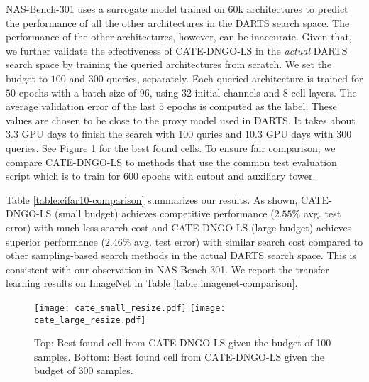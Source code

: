 NAS-Bench-301 uses a surrogate model trained on $60$k architectures to predict the performance of all the other architectures in the DARTS search space. The performance of the other architectures, however, can be inaccurate. Given that, we further validate the effectiveness of CATE-DNGO-LS in the \textit{actual} DARTS search space by training the queried architectures from scratch. We set the budget to $100$ and $300$ queries, separately. Each queried architecture is trained for $50$ epochs with a batch size of $96$, using $32$ initial channels and $8$ cell layers. The average validation error of the last $5$ epochs is computed as the label. These values are chosen to be close to the proxy model used in DARTS. It takes about $3.3$ GPU days to finish the search with $100$ quries and $10.3$ GPU days with $300$ queries. See Figure \ref{fig:cell} for the best found cells. To ensure fair comparison, we compare CATE-DNGO-LS to methods \cite{liu2018darts,Li2019RandomSA,yan2020arch,white2019bananas} that use the common test evaluation script which is to train for $600$ epochs with cutout and auxiliary tower. 

Table \ref{table:cifar10-comparison} summarizes our results.
As shown, CATE-DNGO-LS (small budget) achieves competitive performance ($2.55\%$ avg. test error) with much less search cost and CATE-DNGO-LS (large budget) achieves superior performance ($2.46\%$ avg. test error) with similar search cost compared to other sampling-based search methods \cite{yan2020arch,white2019bananas} in the actual DARTS search space. This is consistent with our observation in NAS-Bench-301. We report the transfer learning results on ImageNet \cite{imagenet_cvpr09} in Table \ref{table:imagenet-comparison}. 



\begin{figure}[t]
	\centering
	\texttt{[image: cate\_small\_resize.pdf]}
	\texttt{[image: cate\_large\_resize.pdf]}
\caption{
    Top: Best found cell from CATE-DNGO-LS given the budget of 100 samples. 
	Bottom: Best found cell from CATE-DNGO-LS given the budget of 300 samples. 
	}
	\label{fig:cell}
\end{figure}


